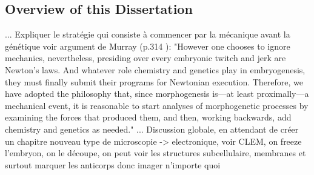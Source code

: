 \subsection{Overview of this Dissertation}
  ...  Expliquer le stratégie qui consiste à commencer par la mécanique avant la génétique voir argument de Murray (p.314 \cite{Murray:2003ty}):  "However one chooses to ignore mechanics, nevertheless, presiding over every embryonic twitch and jerk are Newton’s laws. And whatever role chemistry and genetics play in embryogenesis, they must finally submit their programs for Newtonian execution. Therefore, we have adopted the philosophy that, since morphogenesis is—at least proximally—a mechanical event, it is reasonable to start analyses of morphogenetic processes by examining the forces that produced them, and then, working backwards, add chemistry and genetics as needed."  ...   Discussion globale, en attendant de créer un chapitre  nouveau type de microscopie  -> electronique, voir CLEM, on freeze l'embryon, on le découpe, on peut voir les structures subcellulaire, membranes et surtout marquer les anticorps donc imager n'importe quoi  
